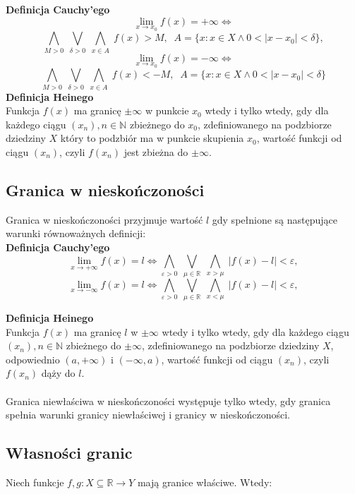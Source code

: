 \documentclass[14pt,a4paper]{extarticle}
\begin{document}
\noindent\textbf{Definicja Cauchy'ego}
$$\lim_{x\to x_{0}} f(x) = +\infty \Leftrightarrow $$
$$\underset{M > 0}{\bigwedge} \;\underset{\delta > 0}{\bigvee} \; \underset{x \in A}{\bigwedge} \; f(x) > M, \;\; A = \{x:x\in X \land 0 < \vert x - x_{0}\vert < \delta\},$$
$$\lim_{x\to x_{0}} f(x) = -\infty \Leftrightarrow $$
$$\underset{M > 0}{\bigwedge} \;\underset{\delta > 0}{\bigvee} \; \underset{x \in A}{\bigwedge} \; f(x) < -M, \;\; A = \{x:x\in X \land 0 < \vert x - x_{0}\vert < \delta\}$$
\noindent\textbf{Definicja Heinego}\\
Funkcja $f(x)$ ma granicę $\pm\infty$ w punkcie $x_{0}$ wtedy i tylko wtedy,
gdy dla każdego ciągu $(x_{n}), n \in \mathbb{N}$ zbieżnego do $x_{0}$, zdefiniowanego na podzbiorze dziedziny $X$ który
to podzbiór ma w punkcie skupienia $x_{0}$, wartość funkcji od ciągu $(x_{n})$, czyli $f(x_{n})$ jest zbieżna do $\pm\infty$.


\subsection{Granica w nieskończoności}
Granica w nieskończoności przyjmuje wartość $l$ gdy spełnione są następujące warunki równoważnych definicji:\\

\noindent\textbf{Definicja Cauchy'ego}
$$\lim_{x\to +\infty} f(x) = l \Leftrightarrow \underset{\varepsilon > 0}{\bigwedge} \;\underset{\mu \in \mathbb{R}}{\bigvee} \; \underset{x > \mu}{\bigwedge} \; \vert f(x) - l \vert < \varepsilon,$$
\nopagebreak[4]
$$\lim_{x\to -\infty} f(x) = l \Leftrightarrow \underset{\varepsilon > 0}{\bigwedge} \;\underset{\mu \in \mathbb{R}}{\bigvee} \; \underset{x < \mu}{\bigwedge} \; \vert f(x) - l \vert < \varepsilon,$$

\noindent\textbf{Definicja Heinego}\\
Funkcja $f(x)$ ma granicę $l$ w $\pm\infty$ wtedy i tylko wtedy,
gdy dla każdego ciągu $(x_{n}), n \in \mathbb{N}$ zbieżnego do $\pm\infty$, zdefiniowanego na podzbiorze dziedziny $X$, 
odpowiednio $(a, +\infty)$ i $(-\infty, a)$, wartość funkcji od ciągu $(x_{n})$, czyli $f(x_{n})$ dąży do $l$.\\\\

\noindent Granica niewłaściwa w nieskończoności występuje tylko wtedy, gdy granica spełnia warunki granicy niewłaściwej i granicy w nieskończoności.\\

\subsection{Własności granic}
\noindent Niech funkcje $f,g :X \subseteq \mathbb{R} \rightarrow Y$ mają granice właściwe. Wtedy:
\end{document}
